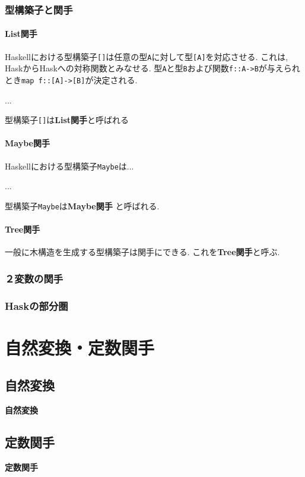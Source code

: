 \documentclass{jsbook}
\theoremstyle{plain}
\begin{document}
\subsection{型構築子と関手}
\subsubsection{List関手}
Haskellにおける型構築子\verb|[]|は任意の型\verb|A|に対して型\verb|[A]|を対応させる.
これは, HaskからHaskへの対称関数とみなせる.
型\verb|A|と型\verb|B|および関数\verb|f::A->B|が与えられとき\verb|map f::[A]->[B]|が決定される.

...

型構築子\verb|[]|は{\bf List関手}と呼ばれる
\subsubsection{Maybe関手}
Haskellにおける型構築子\verb|Maybe|は...

...

型構築子\verb|Maybe|は{\bf Maybe関手}
と呼ばれる.
\subsubsection{Tree関手}
一般に木構造を生成する型構築子は関手にできる. これを{\bf Tree関手}と呼ぶ.


\subsection{２変数の関手}
\subsection{Haskの部分圏}
\chapter{自然変換・定数関手}
\section{自然変換}
\begin{Def}
{\bf 自然変換}
\end{Def}
\section{定数関手}
\begin{Def}
{\bf 定数関手}
\end{Def}
\begin{Def}
\end{Def}
\end{document}
